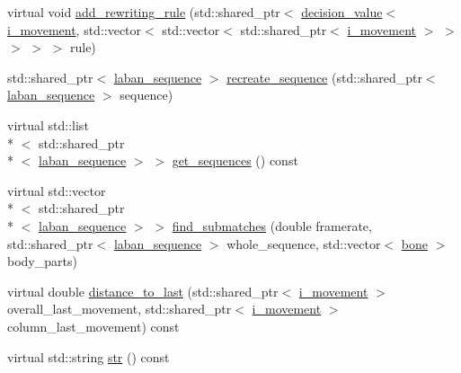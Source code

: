 \begin{DoxyCompactItemize}
\item 
virtual void \hyperlink{classmae_1_1fl_1_1laban_1_1decision__forest_a967fa135b60859542d073b1df27e39c8}{add\-\_\-rewriting\-\_\-rule} (std\-::shared\-\_\-ptr$<$ \hyperlink{classmae_1_1fl_1_1laban_1_1decision__value}{decision\-\_\-value}$<$ \hyperlink{classmae_1_1fl_1_1laban_1_1i__movement}{i\-\_\-movement}, std\-::vector$<$ std\-::vector$<$ std\-::shared\-\_\-ptr$<$ \hyperlink{classmae_1_1fl_1_1laban_1_1i__movement}{i\-\_\-movement} $>$ $>$ $>$ $>$ $>$ rule)
\item 
std\-::shared\-\_\-ptr$<$ \hyperlink{classmae_1_1fl_1_1laban_1_1laban__sequence}{laban\-\_\-sequence} $>$ \hyperlink{classmae_1_1fl_1_1laban_1_1decision__forest_ab295e95474c126e9f61c67897bc456f5}{recreate\-\_\-sequence} (std\-::shared\-\_\-ptr$<$ \hyperlink{classmae_1_1fl_1_1laban_1_1laban__sequence}{laban\-\_\-sequence} $>$ sequence)
\item 
virtual std\-::list\\*
$<$ std\-::shared\-\_\-ptr\\*
$<$ \hyperlink{classmae_1_1fl_1_1laban_1_1laban__sequence}{laban\-\_\-sequence} $>$ $>$ \hyperlink{classmae_1_1fl_1_1laban_1_1decision__forest_a126d3adc28394e6c59e0241236c9cabe}{get\-\_\-sequences} () const 
\item 
virtual std\-::vector\\*
$<$ std\-::shared\-\_\-ptr\\*
$<$ \hyperlink{classmae_1_1fl_1_1laban_1_1laban__sequence}{laban\-\_\-sequence} $>$ $>$ \hyperlink{classmae_1_1fl_1_1laban_1_1decision__forest_adee0c63e7526109a3351d16a156ca024}{find\-\_\-submatches} (double framerate, std\-::shared\-\_\-ptr$<$ \hyperlink{classmae_1_1fl_1_1laban_1_1laban__sequence}{laban\-\_\-sequence} $>$ whole\-\_\-sequence, std\-::vector$<$ \hyperlink{classmae_1_1bone}{bone} $>$ body\-\_\-parts)
\item 
virtual double \hyperlink{classmae_1_1fl_1_1laban_1_1decision__forest_a68c6e9195de2844a2058c8981b97bf29}{distance\-\_\-to\-\_\-last} (std\-::shared\-\_\-ptr$<$ \hyperlink{classmae_1_1fl_1_1laban_1_1i__movement}{i\-\_\-movement} $>$ overall\-\_\-last\-\_\-movement, std\-::shared\-\_\-ptr$<$ \hyperlink{classmae_1_1fl_1_1laban_1_1i__movement}{i\-\_\-movement} $>$ column\-\_\-last\-\_\-movement) const 
\item 
virtual std\-::string \hyperlink{classmae_1_1fl_1_1laban_1_1decision__forest_a94003980df791a1d1818f8aadf547cfb}{str} () const 
\end{DoxyCompactItemize}
